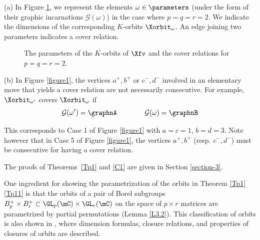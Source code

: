 \begin{exam}
\label{E2.4}
(a)
In Figure \ref{figure2}, we represent the elements $\omega\in\parameters$ (under the form of their graphic incarnations $\mathcal{G}(\omega)$) in the case where $p=q=r=2$. We indicate the dimensions of the corresponding $K$-orbits $\Xorbit_\omega$. An edge joining two parameters indicates a cover relation.

\begin{figure}[h!]
\textcolor{blue}{\xymatrixcolsep{0.4pc}
}
\caption{The parameters of the $K$-orbits of $\Xfv$ and the cover relations for $p=q=r=2$.}
\label{figure2}
\end{figure}

(b) In Figure \ref{figure1}, the vertices $a^+,b^+$ or $c^-,d^-$ involved in an elementary move that yields a cover relation are not necessarily consecutive. For example, $\Xorbit_{\omega'}$ covers $\Xorbit_\omega$
if
\[
\mathcal{G}(\omega')=\graphnA
\qquad\qquad
\mathcal{G}(\omega)=\graphnB
\]

\bigskip
\noindent
This corresponds to Case 1 of Figure \ref{figure1} with $a=c=1$, $b=d=3$.
Note however that in Case 5 of Figure \ref{figure1}, the vertices $a^+,b^+$ (resp. $c^-,d^-$) must be consecutive for having a cover relation.
\end{exam}

The proofs of Theorems~\ref{Tp1} and \ref{C1} are given in Section \ref{section-3}.

One ingredient for showing the parametrization of the orbits in Theorem \ref{Tp1}\ref{Tp11} is that
the orbits of a pair of Borel subgroups $B_p^+\times B_r^+\subset\GL_p(\mC)\times\GL_r(\mC)$ on the space of $p\times r$ matrices are parametrized by partial permutations
(Lemma \ref{L3.2}).
This classification of orbits is also shown in \cite{Fulton-1991}, where dimension formulas, closure relations, and properties of closures of orbits are described.
